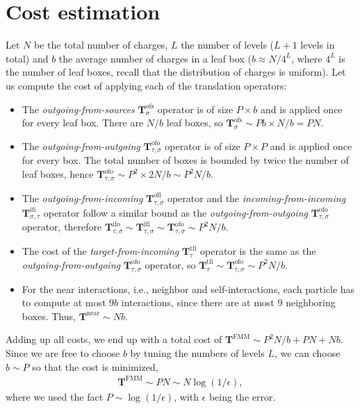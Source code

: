\documentclass[final,onefignum,onetabnum]{siamart220329}
\newcommand{\Tbf}{\mathbf{T}}
\begin{document}
\section{Cost estimation}
Let $N$ be the total number of charges, $L$ the number of levels ($L+1$ levels in total) and $b$ the average number of charges in a leaf box ($b \approx N/4^L$, where $4^L$ is the number of leaf boxes, recall that the distribution of charges is uniform). Let us compute the cost of applying each of the translation operators:
\begin{itemize}
	\item The \textit{outgoing-from-sources} $\Tbf_{\sigma}^\text{ofs}$ operator is of size $P\times b$ and is applied once for every leaf box. There are $N/b$ leaf boxes, so $\Tbf_{\sigma}^\text{ofs}\sim Pb\times N/b = PN $.
	\item The \textit{outgoing-from-outgoing} $\Tbf_{\tau,\sigma}^\text{ofo}$ operator is of size $P\times P$ and is applied once for every box. The total number of boxes is bounded by twice the number of leaf boxes, hence $\Tbf_{\tau,\sigma}^\text{ofo}\sim P^2\times 2N/b \sim P^2N/b$.
	\item The \textit{outgoing-from-incoming} $\Tbf_{\tau,\sigma}^\text{ofi}$ operator and the \textit{incoming-from-incoming} $\Tbf_{\sigma,\tau}^\text{ifi}$ operator follow a similar bound as the \textit{outgoing-from-outgoing} $\Tbf_{\tau,\sigma}^\text{ofo}$ operator, therefore $\Tbf_{\tau,\sigma}^\text{ifo}\sim \Tbf_{\tau,\sigma}^\text{ifi}\sim\Tbf_{\tau,\sigma}^\text{ofo} \sim P^2N/b$.
	\item The cost of the \textit{target-from-incoming} $\Tbf_{\tau}^\text{tfi}$ operator is the same as the \textit{outgoing-from-outgoing} $\Tbf_{\tau,\sigma}^\text{ofo}$ operator, so $\Tbf_{\tau}^\text{tfi}\sim\Tbf_{\tau,\sigma}^\text{ofo}\sim P^2N/b$.
	\item For the near interactions, i.e., neighbor and self-interactions, each particle has to compute at most $9b$ interactions, since there are at most $9$ neighboring boxes. Thus, $\Tbf^\text{near}\sim Nb$.
\end{itemize}
Adding up all costs, we end up with a total cost of $\Tbf^\text{FMM}\sim P^2N/b + PN + Nb$. Since we are free to choose $b$ by tuning the numbers of levels $L$, we can choose $b\sim P$ so that the cost is minimized, 
\begin{align}
	\Tbf^\text{FMM}\sim PN \sim N\log(1/\epsilon), \label{eq:scaling}
\end{align}
where we used the fact $P \sim \log(1/\epsilon)$, with $\epsilon$ being the error.
\end{document}
